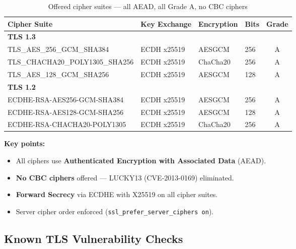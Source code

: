 \documentclass[12pt,a4paper]{article}
\begin{document}
\begin{table}[H]
\centering
\begin{tabularx}{\textwidth}{Xlllc}
\toprule
\textbf{Cipher Suite} & \textbf{Key Exchange} & \textbf{Encryption} & \textbf{Bits} & \textbf{Grade} \\
\midrule
\multicolumn{5}{l}{\textbf{TLS 1.3}} \\
\midrule
TLS\_AES\_256\_GCM\_SHA384 & ECDH x25519 & AESGCM & 256 & A \\
TLS\_CHACHA20\_POLY1305\_SHA256 & ECDH x25519 & ChaCha20 & 256 & A \\
TLS\_AES\_128\_GCM\_SHA256 & ECDH x25519 & AESGCM & 128 & A \\
\midrule
\multicolumn{5}{l}{\textbf{TLS 1.2}} \\
\midrule
ECDHE-RSA-AES256-GCM-SHA384 & ECDH x25519 & AESGCM & 256 & A \\
ECDHE-RSA-AES128-GCM-SHA256 & ECDH x25519 & AESGCM & 128 & A \\
ECDHE-RSA-CHACHA20-POLY1305 & ECDH x25519 & ChaCha20 & 256 & A \\
\bottomrule
\end{tabularx}
\caption{Offered cipher suites --- all AEAD, all Grade A, no CBC ciphers}
\end{table}

\textbf{Key points:}
\begin{itemize}
  \item All ciphers use \textbf{Authenticated Encryption with Associated Data} (AEAD).
  \item \textbf{No CBC ciphers} offered --- LUCKY13 (CVE-2013-0169) eliminated.
  \item \textbf{Forward Secrecy} via ECDHE with X25519 on all cipher suites.
  \item Server cipher order enforced (\texttt{ssl\_prefer\_server\_ciphers on}).
\end{itemize}

\subsection{Known TLS Vulnerability Checks}
\end{document}
